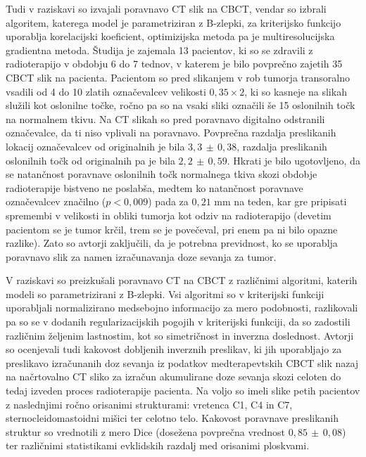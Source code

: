\documentclass[journal]{IEEEtran}
\begin{document}
Tudi v raziskavi \cite{mencarelli2014} so izvajali poravnavo CT slik na CBCT, vendar so izbrali algoritem, katerega model je parametriziran z B-zlepki, za kriterijsko funkcijo uporablja korelacijski koeficient, optimizijska metoda pa je multiresolucijska gradientna metoda. Študija je zajemala 13 pacientov, ki so se zdravili z radioterapijo v obdobju 6 do 7 tednov, v katerem je bilo povprečno zajetih 35 CBCT slik na pacienta. Pacientom so pred slikanjem v rob tumorja transoralno vsadili od 4 do 10 zlatih označevalcev velikosti $0{,}35\times 2$, ki so kasneje na slikah služili kot oslonilne točke, ročno pa so na vsaki sliki označili še 15 oslonilnih točk na normalnem tkivu. Na CT slikah so pred poravnavo digitalno odstranili označevalce, da ti niso vplivali na poravnavo. Povprečna razdalja preslikanih lokacij označevalcev od originalnih je bila $3{,}3\,\pm\,0{,}38$, razdalja preslikanih oslonilnih točk od originalnih pa je bila $2{,}2\,\pm\,0{,}59$. Hkrati je bilo ugotovljeno, da se natančnost poravnave oslonilnih točk normalnega tkiva skozi obdobje radioterapije bistveno ne poslabša, medtem ko natančnost poravnave označevalcev značilno ($p<0{,}009$) pada za $0{,}21$ mm na teden, kar gre pripisati spremembi v velikosti in obliki tumorja kot odziv na radioterapijo (devetim pacientom se je tumor krčil, trem se je povečeval, pri enem pa ni bilo opazne razlike). Zato so avtorji zaključili, da je potrebna previdnost, ko se uporablja poravnavo slik za namen izračunavanja doze sevanja za tumor.

V raziskavi \cite{veiga2015} so preizkušali poravnavo CT na CBCT z različnimi algoritmi, katerih modeli so parametrizirani z B-zlepki. Vsi algoritmi so v kriterijski funkciji uporabljali normalizirano medsebojno informacijo za mero podobnosti, razlikovali pa so se v dodanih regularizacijskih pogojih v kriterijski funkciji, da so zadostili različnim željenim lastnostim, kot so simetričnost in inverzna doslednost. Avtorji so ocenjevali tudi kakovost dobljenih inverznih preslikav, ki jih uporabljajo za preslikavo izračunanih doz sevanja iz podatkov medterapevtskih CBCT slik nazaj na načrtovalno CT sliko za izračun akumulirane doze sevanja skozi celoten do tedaj izveden proces radioterapije pacienta. Na voljo so imeli slike petih pacientov z naslednjimi ročno orisanimi strukturami: vretenca C1, C4 in C7, sternocleidomastoidni mišici ter celotno telo. Kakovost poravnave preslikanih struktur so vrednotili z mero Dice (dosežena povprečna vrednost $0{,}85\,\pm\,0{,}08$) ter različnimi statistikami evklidskih razdalj med orisanimi ploskvami.
\end{document}
